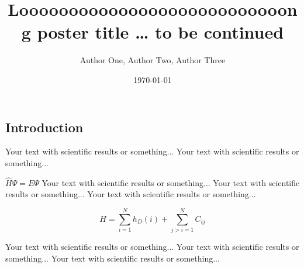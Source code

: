 \documentclass[final]{beamer}
\title
[Super Conference, 1 - 10 July 2013, New York, USA] %
{ %
Looooooooooooooooooooooooooong poster title \ldots{} to be continued
}
\author{ %
Author One\inst{1}, Author Two\inst{2}, Author Three\inst{2,3}
}
\institute
[Very Large University] %
{
\inst{1} Very Large University, Neverland\\[0.3ex]
\inst{2} Other University, Neverland\\[0.3ex]
\inst{3} Yet Another University, Neverland
}
\date{\today}
\begin{document}
\begin{frame}[t]
\begin{multicols}{3}

\section{Introduction}

Your text with scientific results or something... 
Your text with scientific results or something... 

 $\hat H \Psi = E \Psi$  
Your text with scientific results or something... 
Your text with scientific results or something... 
Your text with scientific results or something... 

\begin{equation}
H = \sum_{i=1}^{N} h_{D}(i) + \sum_{j>i=1}^{N} C_{ij}
\end{equation}

Your text with scientific results or something... 
Your text with scientific results or something... 
Your text with scientific results or something... 


\end{multicols}
\end{frame}
\end{document}
